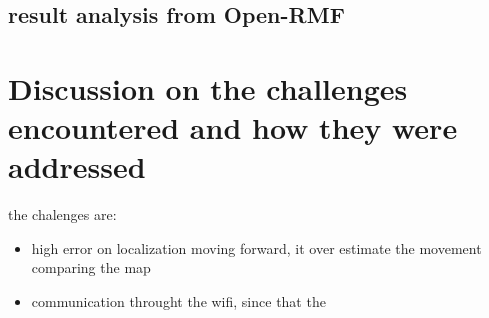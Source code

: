 \section{result analysis from Open-RMF}

\chapter{Discussion on the challenges encountered and how they were addressed}
the chalenges are:
\begin{itemize}
	\item high error on localization moving forward, it over estimate the movement comparing the map
	\item communication throught the wifi, since that the 
\end{itemize}



